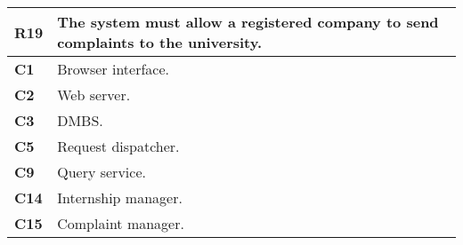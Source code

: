 \begin{table}[H]
    \centering
    \begin{tabular}{|l|m{10cm}|}
        \hline \textbf{R19} & The system must allow a registered company to send complaints to the university.\\
        \hline \textbf{C1} & Browser interface. \\
        \hline \textbf{C2} & Web server. \\
        \hline \textbf{C3} & DMBS. \\
        \hline \textbf{C5} & Request dispatcher. \\
        \hline \textbf{C9} & Query service. \\
        \hline \textbf{C14} & Internship manager. \\
        \hline \textbf{C15} & Complaint manager. \\
        \hline
    \end{tabular}
\end{table}

